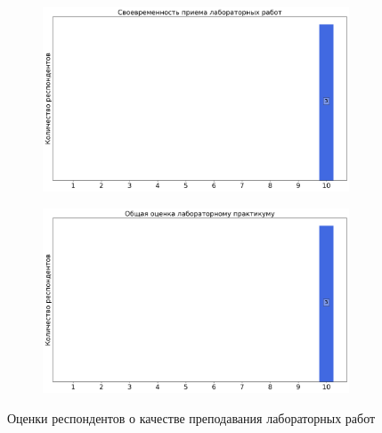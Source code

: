 \begin{figure}[H]
\begin{subfigure}[b]{0.45\textwidth}
                \includegraphics[width=\textwidth]{images/1 course/Общая физика - механика/labniks-marks-Корнева А.А.-2.png}
            \end{subfigure}
            \begin{subfigure}[b]{0.45\textwidth}
                \centering
                \includegraphics[width=\textwidth]{images/1 course/Общая физика - механика/labniks-marks-Корнева А.А.-3.png}
            \end{subfigure}	
            \caption{Оценки респондентов о качестве преподавания лабораторных работ}
        \end{figure}


